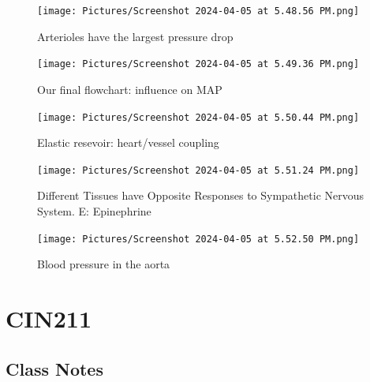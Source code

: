 \documentclass[11pt,fleqn]{book}
\begin{document}
\begin{figure}[h!]
\begin{center}
    \texttt{[image: Pictures/Screenshot 2024-04-05 at 5.48.56 PM.png]}
\end{center}
    \caption{Arterioles have the largest pressure drop}
\end{figure}

\begin{figure}[h!]
\begin{center}
    \texttt{[image: Pictures/Screenshot 2024-04-05 at 5.49.36 PM.png]}
\end{center}
    \caption{Our final flowchart: influence on MAP}
\end{figure}

\begin{figure}[h!]
\begin{center}
    \texttt{[image: Pictures/Screenshot 2024-04-05 at 5.50.44 PM.png]}
\end{center}
    \caption{Elastic resevoir: heart/vessel coupling}
\end{figure}

\begin{figure}[h!]
\begin{center}
    \texttt{[image: Pictures/Screenshot 2024-04-05 at 5.51.24 PM.png]}
\end{center}
    \caption{Different Tissues have Opposite Responses
to Sympathetic Nervous System. E: Epinephrine}
\end{figure}

\begin{figure}[h!]
\begin{center}
    \texttt{[image: Pictures/Screenshot 2024-04-05 at 5.52.50 PM.png]}
\end{center}
    \caption{Blood pressure in the aorta}
\end{figure}







\part{CIN211}
\chapter{Class Notes}
\end{document}
